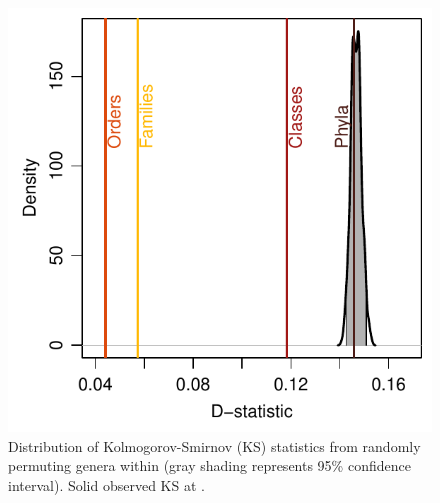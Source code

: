 \documentclass[12pt]{article}
\providecommand{\DIFadd}[1]{{\color{blue}{#1}}} %
\providecommand{\DIFdel}[1]{{\protect\color{red}\sout{}}}                      %
\providecommand{\DIFaddFL}[1]{\DIFadd{#1}} %
\providecommand{\DIFdelFL}[1]{\DIFdel{#1}} %
\providecommand{\DIFaddbeginFL}{} %
\providecommand{\DIFaddendFL}{} %
\providecommand{\DIFdelbeginFL}{} %
\providecommand{\DIFdelendFL}{} %
\newcommand{\DIFscaledelfig}{0.5}
\newlength{\DIFdelgraphicswidth} %
\newlength{\DIFdelgraphicsheight} %
\newcommand{\DIFaddincludegraphics}[2][]{{\color{blue}\fbox{\DIFOincludegraphics[#1]{#2}}}} %
\newcommand{\DIFdelincludegraphics}[2][]{%
\sbox{\DIFdelgraphicsbox}{\DIFOincludegraphics[#1]{#2}}%
\settoboxwidth{\DIFdelgraphicswidth}{\DIFdelgraphicsbox} %
\settoboxtotalheight{\DIFdelgraphicsheight}{\DIFdelgraphicsbox} %
\scalebox{\DIFscaledelfig}{%
\parbox[b]{\DIFdelgraphicswidth}{\usebox{\DIFdelgraphicsbox}\\[-\baselineskip] \rule{\DIFdelgraphicswidth}{0em}}\llap{\resizebox{\DIFdelgraphicswidth}{\DIFdelgraphicsheight}{%
\setlength{\unitlength}{\DIFdelgraphicswidth}%
\begin{picture}(1,1)%
\thicklines\linethickness{2pt} %
{\color[rgb]{1,0,0}\put(0,0){\framebox(1,1){}}}%
{\color[rgb]{1,0,0}\put(0,0){\line( 1,1){1}}}%
{\color[rgb]{1,0,0}\put(0,1){\line(1,-1){1}}}%
\end{picture}%
}\hspace*{3pt}}} %
} %
\DeclareRobustCommand{\DIFaddbeginFL}{\DIFOaddbeginFL \let\includegraphics\DIFaddincludegraphics} %
\DeclareRobustCommand{\DIFaddendFL}{\DIFOaddendFL \let\includegraphics\DIFOincludegraphics} %
\DeclareRobustCommand{\DIFdelbeginFL}{\DIFOdelbeginFL \let\includegraphics\DIFdelincludegraphics} %
\DeclareRobustCommand{\DIFdelendFL}{\DIFOaddendFL \let\includegraphics\DIFOincludegraphics} %
\begin{document}
\begin{figure}[!h]
  \centering
  \DIFdelbeginFL %
\DIFdelendFL \DIFaddbeginFL \includegraphics[scale=1]{../../fig_dStat.pdf}
  \caption[Goodness of superstatistical theory fit]{\DIFaddendFL Distribution of
    Kolmogorov-Smirnov (KS) statistics from randomly permuting genera
    within \DIFdelbeginFL \DIFdelFL{orders }\DIFdelendFL \DIFaddbeginFL \DIFaddFL{familes }\DIFaddendFL (gray shading represents 95\% confidence
    interval). Solid \DIFdelbeginFL \DIFdelFL{black line is }\DIFdelendFL \DIFaddbeginFL \DIFaddFL{colored lines are }\DIFaddendFL observed KS \DIFdelbeginFL \DIFdelFL{statistic }\DIFdelendFL \DIFaddbeginFL \DIFaddFL{statistics }\DIFaddendFL at
    \DIFdelbeginFL \DIFdelFL{the order
    level, while the dashed black line shows the observed KS statistic
    at the class level}\DIFdelendFL \DIFaddbeginFL \DIFaddFL{different taxonomic levels as indicated}\DIFaddendFL .}
  \label{fig:dStat}
\end{figure}
\end{document}
